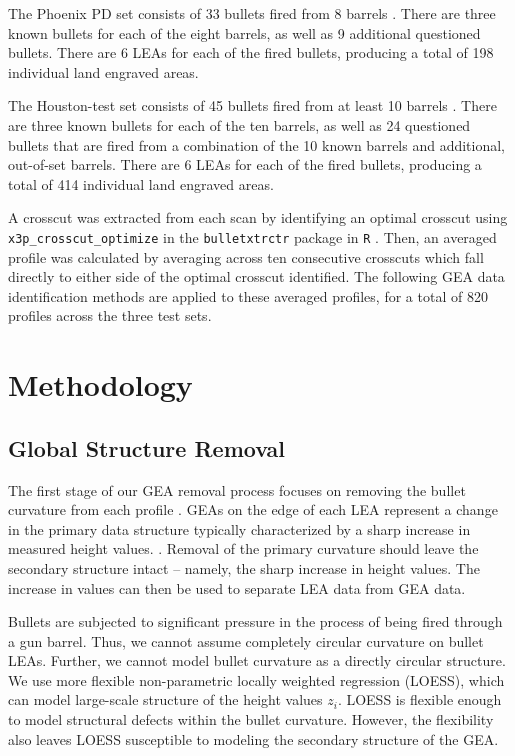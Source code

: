 \documentclass[12pt]{article}
\begin{document}
The Phoenix PD set consists of 33 bullets fired from 8 barrels
. There are three known
bullets for each of the eight barrels, as well as 9 additional
questioned bullets. There are 6 LEAs for each of the fired bullets,
producing a total of 198 individual land engraved areas.

The Houston-test set consists of 45 bullets fired from at least 10
barrels . There are three
known bullets for each of the ten barrels, as well as 24 questioned
bullets that are fired from a combination of the 10 known barrels and
additional, out-of-set barrels. There are 6 LEAs for each of the fired
bullets, producing a total of 414 individual land engraved areas.

A crosscut was extracted from each scan by identifying an optimal
crosscut using \texttt{x3p\_crosscut\_optimize} in the
\texttt{bulletxtrctr} package in \texttt{R} \cite{bulletxtrctr}. Then,
an averaged profile was calculated by averaging across ten consecutive
crosscuts which fall directly to either side of the optimal crosscut
identified. The following GEA data identification methods are applied to
these averaged profiles, for a total of 820 profiles across the three
test sets.

\section{Methodology}

\subsection{Global Structure Removal}

The first stage of our GEA removal process focuses on removing the
bullet curvature from each profile . GEAs on the edge of
each LEA represent a change in the primary data structure typically
characterized by a sharp increase in measured height values.
. Removal of the
primary curvature should leave the secondary structure intact -- namely,
the sharp increase in height values. The increase in values can then be
used to separate LEA data from GEA data.

Bullets are subjected to significant pressure in the process of being
fired through a gun barrel. Thus, we cannot assume completely circular
curvature on bullet LEAs. Further, we cannot model bullet curvature as a
directly circular structure. We use more flexible non-parametric locally
weighted regression (LOESS), which can model large-scale structure of
the height values \(z_i\). LOESS is flexible enough to model structural
defects within the bullet curvature. However, the flexibility also
leaves LOESS susceptible to modeling the secondary structure of the GEA.
\end{document}

